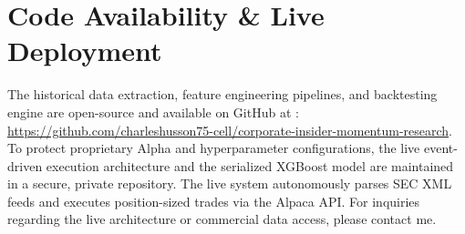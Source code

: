 \documentclass{article}
\begin{document}
\section{Code Availability \& Live Deployment}
The historical data extraction, feature engineering pipelines, and backtesting engine are open-source and available on GitHub at : \\ \url{https://github.com/charleshusson75-cell/corporate-insider-momentum-research}. \\
To protect proprietary Alpha and hyperparameter configurations, the live event-driven execution architecture and the serialized XGBoost model are maintained in a secure, private repository. The live system autonomously parses SEC XML feeds and executes position-sized trades via the Alpaca API. For inquiries regarding the live architecture or commercial data access, please contact me.
\end{document}
